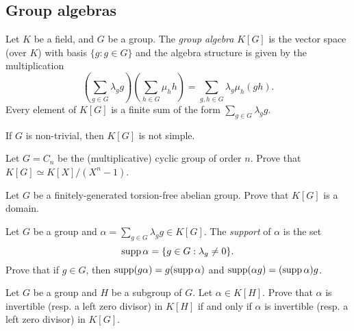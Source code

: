 
\subsection{Group algebras}

Let $K$ be a field, and $G$ be a group. The \emph{group algebra} $K[G]$ 
is the vector space (over $K$) with basis $\{g:g\in G\}$ 
and the algebra structure is given by the multiplication
\[
	\left(\sum_{g\in G}\lambda_gg\right)\left(\sum_{h\in G}\mu_hh\right)
	=\sum_{g,h\in G}\lambda_g\mu_h(gh).
\]
Every element of $K[G]$ is a finite sum of the form $\sum_{g\in G}\lambda_gg$.

\begin{exercise}
\label{xc:K[G]notsimple}
    If $G$ is non-trivial, then $K[G]$ is not simple. 
\end{exercise}

\begin{exercise}
\label{xca:K_cyclic}
	Let $G=C_n$ be the (multiplicative) cyclic group of order $n$. Prove that 
	$K[G]\simeq K[X]/(X^n-1)$. 
\end{exercise}

\begin{exercise}
\label{xca:abelian=>domain}
	Let $G$ be a finitely-generated torsion-free abelian group. Prove that 
	$K[G]$ is a domain. 
\end{exercise}



\begin{exercise}
	Let $G$ be a group and $\alpha=\sum_{g\in G}\lambda_gg\in K[G]$.  
	The \emph{support} of $\alpha$ is the set 
	\[
		\operatorname{supp}\alpha=\{g\in G:\lambda_g\ne 0\}.
	\]
	Prove that if $g\in G$, then 
	$\operatorname{supp}(g\alpha)=g(\operatorname{supp}\alpha)$ and $\operatorname{supp}(\alpha g)=(\operatorname{supp}\alpha)g$.
\end{exercise}

\begin{exercise}
\label{xca:invertible_subgroups}
	Let $G$ be a group and $H$ be a subgroup of $G$. Let $\alpha\in K[H]$. Prove that 
    $\alpha$ is invertible (resp. a left zero divisor) in $K[H]$ if and only if 
	$\alpha$ is invertible (resp. a left zero divisor) in
	$K[G]$.
\end{exercise}


